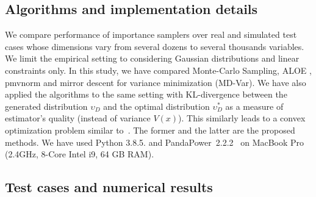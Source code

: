 \subsection{Algorithms and implementation details}
We compare performance of importance samplers over real and simulated test cases whose dimensions vary from several dozens to several thousands variables. We limit the empirical setting to considering Gaussian distributions and linear constraints only. 
%
In this study, we have compared Monte-Carlo Sampling, ALOE \cite{owen2019importance}, pmvnorm \cite{genz2020package} and mirror descent for variance minimization (MD-Var). We have also applied the algorithms to the same setting with KL-divergence \cite{l2009monte} between the generated distribution $\upsilon_D$ and the optimal distribution $\upsilon^*_D$ as a measure of estimator's quality (instead of variance $V(x)$). This similarly leads to a convex optimization problem similar to~\cite{rubinstein2013cross}. The former and the latter are the proposed methods.  %
%
%
%
We have used Python 3.8.5. and PandaPower~2.2.2~\cite{pandapower.2018} on MacBook Pro (2.4GHz, 8-Core Intel i9, 64 GB RAM). %

\subsection{Test cases and numerical results}

